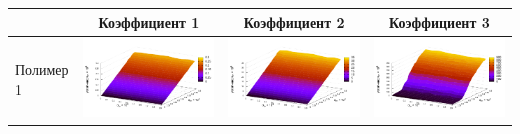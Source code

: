 \documentclass[12pt,a4paper]{article}
\begin{document}
\begin{table}[h]
  \centering
  \footnotesize
  \begin{tabular}{l | c c c}
	  & Коэффициент 1 & Коэффициент 2 & Коэффициент 3 \\ \hline
	\begin{rotate}{90}Полимер 1\end{rotate} &	\includegraphics[scale=0.4]{figs/even/p1.txt_coeff0.dat.pdf} & \includegraphics[scale=0.4]{figs/even/p1.txt_coeff1.dat.pdf} & \includegraphics[scale=0.4]{figs/even/p1.txt_coeff2.dat.pdf} \\

\end{tabular}
\end{table}
\end{document}
